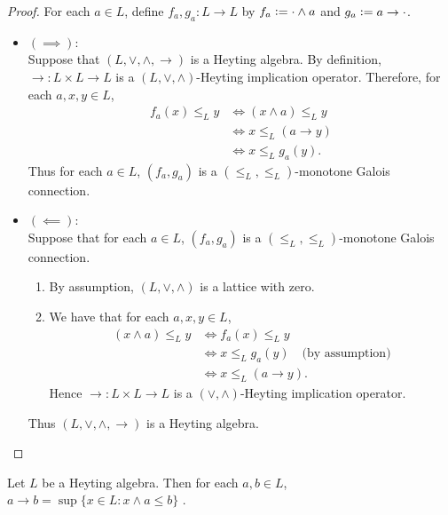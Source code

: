 \documentclass{book}
\begin{document}
	\begin{proof}
		For each $a \in L$, define $f_a,g_a: L \rightarrow L$ by $f_a \vcentcolon= \cdot \wedge a$ and $g_a \vcentcolon= a \rightarrow \cdot$.
		\begin{itemize}
			\item $(\implies)$: \\
			Suppose that $(L, \vee, \wedge, \rightarrow)$ is a Heyting algebra. By definition, $\rightarrow : L \times L \rightarrow L$ is a $(L, \vee, \wedge)$-Heyting implication operator. Therefore, for each $a, x, y \in L$,  
			\begin{align*}
				f_a(x) \leq_L y 
				& \iff (x \wedge a) \leq_L y \\
				& \iff x \leq_L (a \rightarrow y) \\
				& \iff x \leq_L g_a(y).
			\end{align*}
			Thus for each $a \in L$, $(f_a, g_a)$ is a $(\leq_L, \leq_L)$-monotone Galois connection. 
			\item $(\impliedby)$: \\
			Suppose that for each $a \in L$, $(f_a, g_a)$ is a $(\leq_L, \leq_L)$-monotone Galois connection. 
			\begin{enumerate}
				\item By assumption, $(L, \vee, \wedge)$ is a lattice with zero.
				\item We have that for each $a, x, y \in L$,
				\begin{align*}
					(x \wedge a) \leq_L y
					& \iff f_a(x) \leq_L y \\
					& \iff x \leq_L g_a(y) \quad \text{(by assumption)} \\
					& \iff x \leq_L (a \rightarrow y). 
				\end{align*}
				Hence $\rightarrow: L \times L \rightarrow L$ is a $(\vee, \wedge)$-Heyting implication operator.
			\end{enumerate}
			Thus $(L, \vee, \wedge, \rightarrow)$ is a Heyting algebra.
		\end{itemize}
	\end{proof}
	
	\begin{ex}
		Let $L$ be a Heyting algebra. Then for each $a,b \in L$, $a \rightarrow b = \sup \{x \in L: x \wedge a \leq b\}$ . 
	\end{ex}
	
\end{document}
